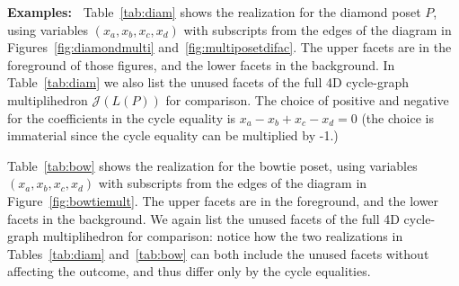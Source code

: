 \documentclass{article}
\begin{document}
\textbf{Examples:~} Table~\ref{tab:diam} shows the realization for the diamond poset $P$, using variables $(x_a,x_b,x_c,x_d)$ with subscripts from the edges of the diagram in Figures~\ref{fig:diamondmulti} and~\ref{fig:multiposetdifac}. The upper facets are in the foreground of those figures, and the lower facets in the background. In Table~\ref{tab:diam} we also list the unused facets of the full 4D cycle-graph multiplihedron $\mathcal{J}(L(P))$ for comparison. The choice of positive and negative for the coefficients in the cycle equality is  $x_a-x_b+x_c-x_d =0$ (the choice is immaterial since the cycle equality can be multiplied by -1.)
















Table~\ref{tab:bow} shows the realization for the bowtie poset, using variables $(x_a,x_b,x_c,x_d)$ with subscripts from the edges of the diagram in Figure~\ref{fig:bowtiemult}. The upper facets are in the foreground, and the lower facets in the background. We again list the unused facets of the full 4D cycle-graph multiplihedron for comparison: notice how the two realizations in Tables~\ref{tab:diam} and~\ref{tab:bow} can both include the unused facets without affecting the outcome, and thus differ only by the cycle equalities.  \\
\end{document}
